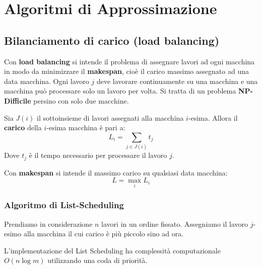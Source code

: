 \documentclass[\main/main.tex]{subfiles}
\begin{document}
\chapter{Algoritmi di Approssimazione}
\section{Bilanciamento di carico (load balancing)}
Con \textbf{load balancing} si intende il problema di assegnare lavori ad ogni macchina in modo da minimizzare il \textbf{makespan}, cioè il carico massimo assegnato ad una data macchina. Ogni lavoro \(j\) deve lavorare continuamente su una macchina e una macchina può processare solo un lavoro per volta. Si tratta di un problema \textbf{NP-Difficile} persino con solo due macchine.
\begin{definition}[Carico]
	Sia \(J(i)\) il sottoinsieme di lavori assegnati alla macchina \(i\)-esima.
	Allora il \textbf{carico} della \(i\)-esima macchina è pari a:
	\[
		L_i = \sum_{j \in J(i)} t_j
	\]
	Dove \(t_j\) è il tempo necessario per processare il lavoro \(j\).
\end{definition}
\begin{definition}[Makespan]
	Con \textbf{makespan} si intende il massimo carico su qualsiasi data macchina:
	\[
		L = \max_{i} L_i
	\]
\end{definition}
\subsection{Algoritmo di List-Scheduling}
Prendiamo in considerazione \(n\) lavori in un ordine fissato. Assegniamo il lavoro \(j\)-esimo alla macchina il cui carico è più piccolo sino ad ora.

\begin{complexity}
	L'implementazione del List Scheduling ha complessità computazionale \(O(n\log m)\) utilizzando una coda di priorità.
\end{complexity}
\end{document}
